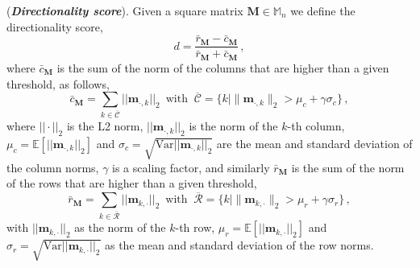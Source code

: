 \begin{definition}
\label{def-directionality-score}
%
(\textbf{\emph{Directionality score}}).
%
Given a square matrix $\bm{M} \in \mathbb{M}_n$ we define the directionality score,
%
\begin{equation}
\label{eq:definition-directionality-score}
    d =  \dfrac{\bar{r}_{\bm{M}} - \bar{c}_{\bm{M}}}{\bar{r}_{\bm{M}} + \bar{c}_{\bm{M}}} \,,
\end{equation}
%
where $\bar{c}_{\bm{M}}$ is the sum of the norm of the columns that are higher than a given threshold, as follows,
%
\begin{equation}
    \bar{c}_{\bm{M}} = \sum_{k \in \overline{\mathcal{C}}} ||\bm{m}_{\cdot, k}||_2
    \,\,\, \text{with} \,\,\ \overline{\mathcal{C}} = \{k \mid \|\mathbf{m}_{\cdot,k}\|_2 > \mu_c + \gamma \sigma_c\}\,,
\end{equation}
%
where $|| \cdot ||_2$ is the L2 norm, $||\bm{m}_{\cdot, k}||_2$ is the norm of the $k$-th column, $\mu_c = \mathbb{E}[||\bm{m}_{\cdot, k}||_2]$
and $\sigma_c = \sqrt{\text{Var}||\bm{m}_{\cdot, k}||_2}$ are the mean and standard deviation of the column norms, $\gamma$ is a scaling factor, and similarly  $\bar{r}_{\bm{M}}$ is the sum of the norm of the rows that are higher than a given threshold,
%
%
\begin{equation}
    \bar{r}_{\bm{M}} = \sum_{k \in \overline{\mathcal{R}}} ||\bm{m}_{k, \cdot}||_2
    \,\,\, \text{with} \,\,\ \overline{\mathcal{R}} = \{k \mid \|\mathbf{m}_{k, \cdot}\|_2 > \mu_r + \gamma \sigma_r\}\,,
\end{equation}
%
with $||\bm{m}_{k, \cdot}||_2$ as the norm of the $k$-th row, $\mu_r = \mathbb{E}[||\bm{m}_{k,\cdot}||_2]$
and $\sigma_r = \sqrt{\text{Var}||\bm{m}_{k, \cdot}||_2}$ as the mean and standard deviation of the row norms.

%
\end{definition}